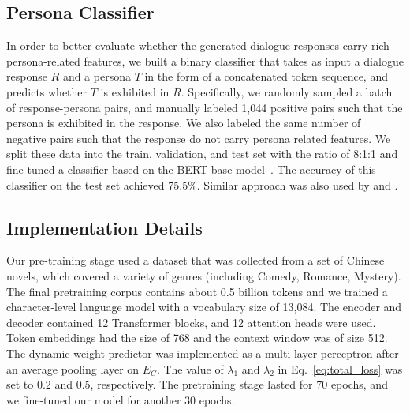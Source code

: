 \documentclass[letterpaper]{article} %
\newcommand{\citet}[1]{\citeauthor{#1} \shortcite{#1}}
\newcommand{\citep}{\cite}
\begin{document}
\subsection{Persona Classifier}\label{sec:persona_cls}
In order to better evaluate whether the generated dialogue responses carry rich persona-related features, we built a binary classifier that takes as input a dialogue response $R$ and a persona $T$ in the form of a concatenated token sequence, and predicts whether $T$ is exhibited in $R$. Specifically, we randomly sampled a batch of response-persona pairs, and manually labeled 1,044 positive pairs such that the persona is exhibited in the response. We also labeled the same number of negative pairs such that the response do not carry persona related features. We split these data into the train, validation, and test set with the ratio of 8:1:1 and fine-tuned a classifier based on the BERT-base model~\citep{devlin2018bert}. The accuracy of this classifier on the test set achieved 75.5\%. Similar approach was also used by \citet{zhou2018emotional} and \citet{zheng2019Personal}.

\subsection{Implementation Details}
Our pre-training stage used a dataset that was collected from a set of Chinese novels, which covered a variety of genres (including Comedy, Romance, Mystery). The final pretraining corpus contains about 0.5 billion tokens and we trained a character-level language model with a vocabulary size of 13,084. The encoder and decoder contained 12 Transformer blocks, and 12 attention heads were used. Token embeddings had the size of 768 and the context window was of size 512. The dynamic weight predictor was implemented as a multi-layer perceptron after an average pooling layer on $E_C$. The value of $\lambda_1$ and $\lambda_2$ in Eq.~\ref{eq:total_loss} was set to 0.2 and 0.5, respectively. The pretraining stage lasted for 70 epochs, and we fine-tuned our model for another 30 epochs.
\end{document}
